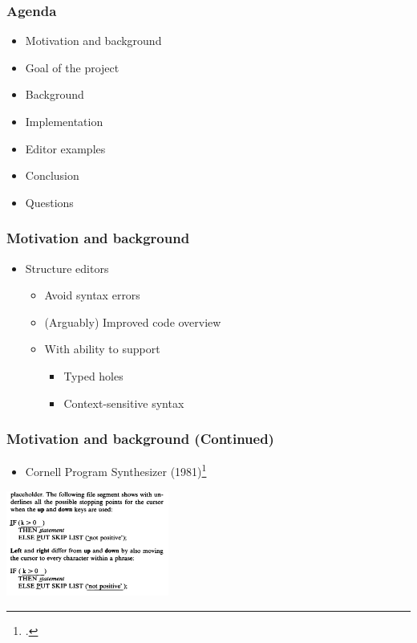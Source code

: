 \documentclass[t,24pt,aspectratio=169]{beamer}
\begin{document}
\begin{frame}[hvid]
    \frametitle{Agenda}

    \begin{itemize}
        \item Motivation and background
        \item Goal of the project
        \item Background
        \item Implementation
        \item Editor examples
        \item Conclusion
        \item Questions
    \end{itemize}
\end{frame}

\begin{frame}[hvid]
    \frametitle{Motivation and background}
    \begin{itemize}
        \item Structure editors
              \begin{itemize}
                  \item Avoid syntax errors
                  \item (Arguably) Improved code overview
                  \item With ability to support
                        \begin{itemize}
                            \item Typed holes
                            \item Context-sensitive syntax
                        \end{itemize}
              \end{itemize}
    \end{itemize}
\end{frame}


\begin{frame}[hvid]
    \frametitle{Motivation and background (Continued)}

    \begin{multicols}{2}
        \begin{itemize}
            \item Cornell Program Synthesizer (1981)\footcite{timtom81}

        \end{itemize}
        \vfill\null
        \columnbreak
        \includegraphics[width=0.4\textwidth]{img/cornell-ex.png}
    \end{multicols}
\end{frame}
\end{document}
